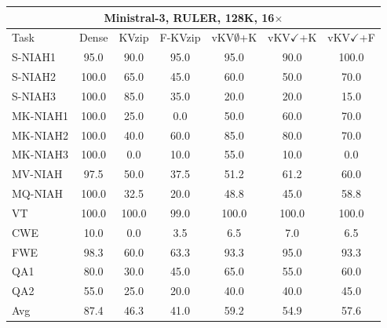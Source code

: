 \begin{tabular}{lcccccc}
\toprule
\multicolumn{7}{c}{Ministral-3, RULER, 128K, 16$\times$} \\
\midrule
Task & Dense & KVzip & F-KVzip & vKV$\emptyset$+K & vKV$\checkmark$+K & vKV$\checkmark$+F \\
\midrule
S-NIAH1 & 95.0 & 90.0 & 95.0 & 95.0 & 90.0 & 100.0 \\
S-NIAH2 & 100.0 & 65.0 & 45.0 & 60.0 & 50.0 & 70.0 \\
S-NIAH3 & 100.0 & 85.0 & 35.0 & 20.0 & 20.0 & 15.0 \\
MK-NIAH1 & 100.0 & 25.0 & 0.0 & 50.0 & 60.0 & 70.0 \\
MK-NIAH2 & 100.0 & 40.0 & 60.0 & 85.0 & 80.0 & 70.0 \\
MK-NIAH3 & 100.0 & 0.0 & 10.0 & 55.0 & 10.0 & 0.0 \\
MV-NIAH & 97.5 & 50.0 & 37.5 & 51.2 & 61.2 & 60.0 \\
MQ-NIAH & 100.0 & 32.5 & 20.0 & 48.8 & 45.0 & 58.8 \\
VT & 100.0 & 100.0 & 99.0 & 100.0 & 100.0 & 100.0 \\
CWE & 10.0 & 0.0 & 3.5 & 6.5 & 7.0 & 6.5 \\
FWE & 98.3 & 60.0 & 63.3 & 93.3 & 95.0 & 93.3 \\
QA1 & 80.0 & 30.0 & 45.0 & 65.0 & 55.0 & 60.0 \\
QA2 & 55.0 & 25.0 & 20.0 & 40.0 & 40.0 & 45.0 \\
\midrule
Avg & 87.4 & 46.3 & 41.0 & 59.2 & 54.9 & 57.6 \\
\bottomrule
\end{tabular}
\vspace{0.8em}

